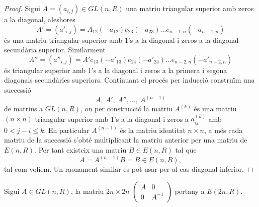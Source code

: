 \begin{proof}
Sigui $A=(a_{i,j}) \in GL(n,R)$ una matriu triangular superior amb zeros a la diagonal, aleshores
$$
A'=(a'_{i,j})=A_{12}(-a_{12})e_{23}(-a_{23})\dots e_{n-1,n}(-a_{n-1,n})
$$
és una matriu triangular superior amb 1's a la diagonal i zeros a la diagonal secundària superior. Similarment
$$
A''=(a''_{i,j})=A'e_{13}(-a'_{13})e_{24}(-a'_{24})\dots e_{n-2,n}(-a'_{n-2,n})
$$
és triangular superior amb 1's a la diagonal i zeros a la primera i segona diagonals secundàries superiors. Continuant el procés per inducció construïm una successió
$$
A, \ A', \ A'', \dots , \  A^{(n-1)}
$$
de matrius a $GL(n,R)$, on per construcció la matriu $A^{(k)}$ és una matriu $(n\times n)$ triangular superior amb 1's a la diagonal i zeros a $a_{ij}^{(k)}$ amb $0<j-i\leq k$. En particular $A^{(n-1)}$ és la matriu identitat $n\times n$, a més cada matriu de la successió s'obté multiplicant la matriu anterior per una matriu de $E(n,R)$. Per tant existeix una matriu $B\in E(n,R)$ tal que $$A=A^{(n-1)}B=B \in E(n,R),$$ tal com volíem. Un raonament similar es pot usar per al cas diagonal inferior.
\end{proof}

\begin{cor} \label{matriuElemental}
Sigui $A\in GL(n,R)$, la matriu $2n\times 2n$ 
$\left( \begin{matrix}
  A & 0 \\
  0 & A^{-1}
 \end{matrix} \right)$ 
 pertany a $E(2n,R)$.
\end{cor}

